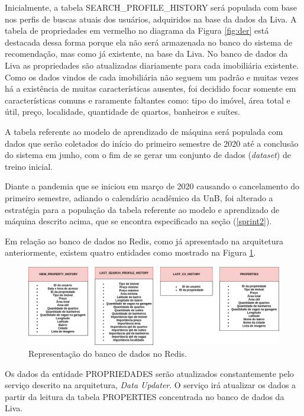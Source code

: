 Inicialmente, a tabela SEARCH\_PROFILE\_HISTORY será populada com base nos perfis de buscas atuais dos usuários, adquiridos na base da dados da Liva. A tabela de propriedades em vermelho no diagrama da Figura \ref{fig:der} está destacada dessa forma porque ela não será armazenada no banco do sistema de recomendação, mas como já existente, na base da Liva. No banco de dados da Liva as propriedades são atualizadas diariamente para cada imobiliária existente. Como os dados vindos de cada imobiliária não seguem um padrão e muitas vezes há a existência de muitas características ausentes, foi decidido focar somente em características comuns e raramente faltantes como: tipo do imóvel, área total e útil, preço, localidade, quantidade de quartos, banheiros e suítes.

A tabela referente ao modelo de aprendizado de máquina será populada com dados que serão coletados do início do primeiro semestre de 2020 até a conclusão do sistema em junho, com o fim de se gerar um conjunto de dados (\textit{dataset}) de treino inicial.

Diante a pandemia que se iniciou em março de 2020 causando o cancelamento do primeiro semestre, adiando o calendário acadêmico da UnB, foi alterado a estratégia para a população da tabela referente ao modelo e aprendizado de máquina descrito acima, que se encontra especificado na seção (\ref{sprint2}).

Em relação ao banco de dados no Redis, como já apresentado na arquitetura anteriormente, existem quatro entidades como mostrado na Figura \ref{fig:redis}.

\begin{figure}[H]
    \centering
    \includegraphics[scale=0.4]{figuras/proposta/redis.png}
    \caption[Representação do banco de dados no Redis]{Representação do banco de dados no Redis.}
    \label{fig:redis}
\end{figure}

Os dados da entidade PROPRIEDADES serão atualizados constantemente pelo serviço descrito na arquitetura, \textit{Data Updater}. O serviço irá atualizar os dados a partir da leitura da tabela PROPERTIES concentrada no banco de dados da Liva.

